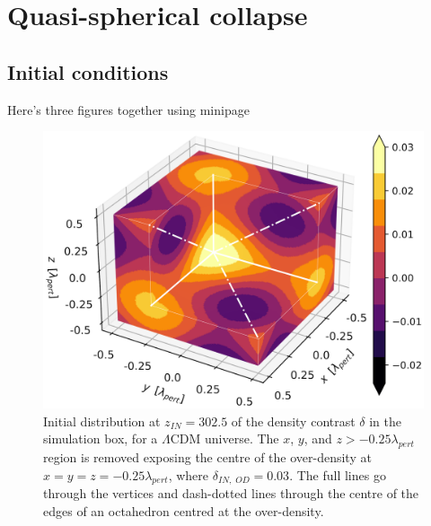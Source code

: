 \chapter{Quasi-spherical collapse}
\label{sec: Sim}

\section{Initial conditions} \label{sec: Sim: IC}

Here's three figures together using minipage

\begin{figure}[th!]
    \centering
    \begin{minipage}{.49\textwidth}
        \centering
        \includegraphics[width=\linewidth]{plots/Paper2/Initial_3d_delta.png}
        \caption[Initial $\delta$ in the simulation box]{Initial distribution at $z_{IN} = 302.5$ of the density contrast $\delta$ in the simulation box, for a $\Lambda$CDM universe. The $x$, $y$, and $z >-0.25\lambda_{pert}$ region is removed exposing the centre of the over-density at $x=y=z=-0.25\lambda_{pert}$, where $\delta_{IN,\;OD}=0.03$. The full lines go through the vertices and dash-dotted lines through the centre of the edges of an octahedron centred at the over-density.}
        \label{fig: IniDelta3d}
    \end{minipage}
    \hspace{0.05cm}
    \begin{minipage}{.49\textwidth}
        \centering

\end{minipage}
\end{figure}
